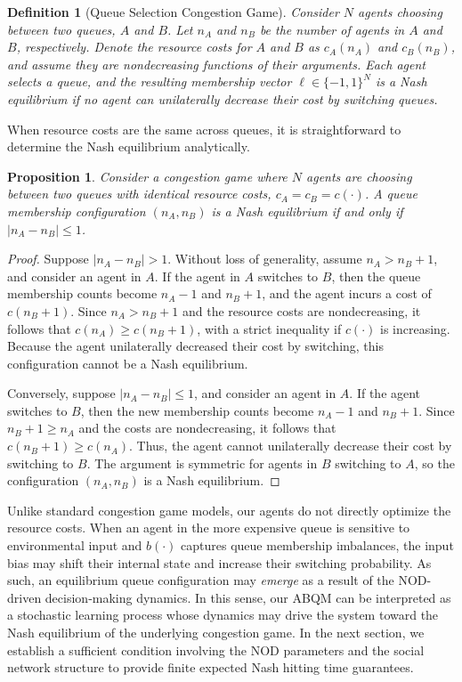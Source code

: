 \documentclass[conference]{IEEEtran}
\newtheorem{definition}{Definition}
\newtheorem{prop}{Proposition}
\begin{document}
\begin{definition}[Queue Selection Congestion Game]\label{def:congestion_game_queue_choice}
Consider $N$ agents choosing between two queues, $A$ and $B$.
Let $n_A$ and $n_B$ be the number of agents in $A$ and $B$, respectively.  
Denote the resource costs for $A$ and $B$ as $c_A(n_A)$ and $c_B(n_B)$, and assume they are nondecreasing functions of their arguments.
Each agent selects a queue, and the resulting membership vector $\boldsymbol{\ell} \in \{-1, 1\}^N$ is a Nash equilibrium if no agent can unilaterally decrease their cost by switching queues.
\end{definition}     
When resource costs are the same across queues, it is straightforward to determine the Nash equilibrium analytically.
\begin{prop}\label{pro:nash_configs}
Consider a congestion game where $N$ agents are choosing between two queues with identical resource costs, $c_A = c_B = c(\cdot)$. A queue membership configuration $(n_A, n_B)$ is a Nash equilibrium if and only if $|n_A - n_B| \leq 1$. 
\end{prop}
\begin{proof}
    Suppose $|n_A - n_B| > 1$. Without loss of generality, assume $n_A > n_B + 1$, and consider an agent in $A$. If the agent in $A$ switches to $B$, then the queue membership counts become $n_A - 1$ and $n_B + 1$, and the agent incurs a cost of $c(n_B + 1)$. Since $n_A > n_B +1$ and the resource costs are nondecreasing, it follows that $c(n_A) \ge c(n_B +1)$, with a strict inequality if $c(\cdot)$ is increasing.
    Because the agent unilaterally decreased their cost by switching, this configuration cannot be a Nash equilibrium. 

    Conversely, suppose $|n_A - n_B| \leq 1$, and consider an agent in $A$. If the agent switches to $B$, then the new membership counts become $n_A - 1$ and $n_B + 1$. Since $n_B + 1 \ge n_A$ and the costs are nondecreasing, it follows that $c(n_B + 1) \ge c(n_A)$. Thus, the agent cannot unilaterally decrease their cost by switching  to $B$. The argument is symmetric for agents in $B$ switching to $A$, so the configuration $(n_A, n_B)$ is a Nash equilibrium.
\end{proof}
Unlike standard congestion game models, our agents do not directly optimize the resource costs. 
When an agent in the more expensive queue is sensitive to environmental input and $b(\cdot)$ captures queue membership imbalances, the input bias may shift their internal state and increase their switching probability. 
As such, an equilibrium queue configuration may \emph{emerge} as a result of the NOD-driven decision-making dynamics.
In this sense, our ABQM can be interpreted as a stochastic learning process whose dynamics may drive the system toward the Nash equilibrium of the underlying congestion game. 
In the next section, we establish a sufficient condition involving the NOD parameters and the social network structure to provide finite expected Nash hitting time guarantees. 
\end{document}
